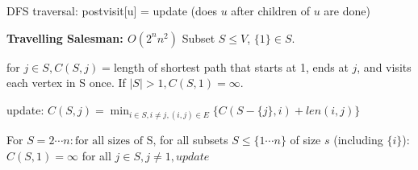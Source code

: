 \documentclass[10pt,twocolumn]{article}
\begin{document}
DFS traversal: postvisit[u] = update (does $u$ after children of $u$ are done)

{\bf Travelling Salesman: $O(2^nn^2)$} 
Subset $S \leq V$, $\{1\} \in S$.

for $j\in S, C(S,j)=$length of shortest path that starts at 1, ends at $j$, and visits each vertex in S once. If $|S| > 1, C(S,1)=\infty$.

update: $C(S,j)=\displaystyle\min_{i\in S, i\neq j, (i,j)\in E}\{C(S-\{j\},i)+len(i,j)\}$

For $S=2\cdots n: \mbox{for all sizes of S,}$ for all subsets $S\leq \{1\cdots n\}$ of size $s$ (including $\{i\}$): $C(S,1)=\infty$ for all $j\in S, j\neq 1, update$
\end{document}
